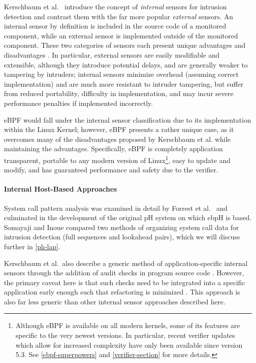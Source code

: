 \documentclass[
  12pt]{findlay}
\begin{document}
Kerschbaum et al.~\autocite{spafford02} introduce the concept of
\emph{internal} sensors for intrusion detection and contrast them with
the far more popular \emph{external} sensors. An internal sensor by
definition is included in the source code of a monitored component,
while an external sensor is implemented outside of the monitored
component. These two categories of sensors each present unique
advantages and disadvantages \autocite{spafford02}. In particular,
external sensors are easily modifiable and extensible, although they
introduce potential delays, and are generally weaker to tampering by
intruders; internal sensors minimize overhead (assuming correct
implementation) and are much more resistant to intruder tampering, but
suffer from reduced portability, difficulty in implementation, and may
incur severe performance penalties if implemented incorrectly.

eBPF would fall under the internal sensor classification
\autocite{spafford02} due to its implementation within the Linux Kernel;
however, eBPF presents a rather unique case, as it overcomes many of the
disadvantages proposed by Kerschbaum et al. while maintaining the
advantages. Specifically, eBPF is completely application transparent,
portable to any modern version of
Linux\footnote{Although eBPF is available on all modern kernels, some of its features are specific to the
very newest versions. In particular, recent verifier updates which allow for increased complexity have only been
available since version 5.3. See \autoref{ebpf-superpowers} and \autoref{verifier-section} for more details.},
easy to update and modify, and has guaranteed performance and safety due
to the verifier.

\hypertarget{internal-host-based-approaches}{%
\paragraph{Internal Host-Based
Approaches}\label{internal-host-based-approaches}}

System call pattern analysis was examined in detail by Forrest et
al.~\autocite{forrest96} and culminated in the development of the
original pH system \autocite{soma02} on which ebpH is based. Somayaji
and Inoue \autocite{soma07} compared two methods of organizing system
call data for intrusion detection (full sequences and lookahead pairs),
which we will discuss further in \autoref{ph-lap}.

Kerschbaum et al.~also describe a generic method of application-specific
internal sensors through the addition of audit checks in program source
code \autocite{spafford02}. However, the primary caveat here is that
such checks need to be integrated into a specific application early
enough such that refactoring is minimized \autocite{peng95,spafford02}.
This approach is also far less generic than other internal sensor
approaches described here.
\end{document}
